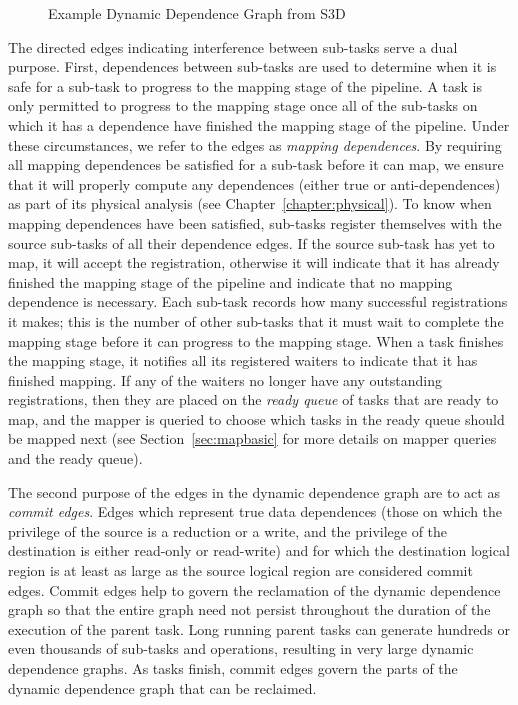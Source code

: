 \begin{figure}[ht!]
\caption{Example Dynamic Dependence Graph from S3D\label{fig:s3ddg}}
\end{figure}

The directed edges indicating interference
between sub-tasks serve a dual purpose. First,
dependences between sub-tasks are used to determine
when it is safe for a sub-task to progress to
the mapping stage of the pipeline.  A task is
only permitted to progress to the mapping stage
once all of the sub-tasks on which it has a
dependence have finished the mapping stage of
the pipeline. Under these circumstances, we
refer to the edges as {\em mapping dependences}.
By requiring all mapping dependences be
satisfied for a sub-task before it can map,
we ensure that it will properly compute any
dependences (either true or anti-dependences)
as part of its physical analysis (see
Chapter~\ref{chapter:physical}). To know when
mapping dependences have been satisfied, sub-tasks
register themselves with the source sub-tasks
of all their dependence edges. If the source
sub-task has yet to map, it will accept the
registration, otherwise it will indicate that
it has already finished the mapping stage
of the pipeline and indicate that no mapping
dependence is necessary.
Each sub-task records how many successful
registrations it makes; this is the number
of other sub-tasks that it must wait to
complete the mapping stage before it can progress
to the mapping stage. When a task finishes
the mapping stage, it notifies all its
registered waiters to indicate that it has
finished mapping. If any of the waiters no
longer have any outstanding registrations, then
they are placed on the {\em ready queue} of 
tasks that are ready to map, and the mapper
is queried to choose which tasks in the
ready queue should be mapped next (see 
Section~\ref{sec:mapbasic} for more details
on mapper queries and the ready queue).

The second purpose of the edges in the
dynamic dependence graph are to act as
{\em commit edges}. Edges which represent
true data dependences (those on which the
privilege of the source is a reduction or 
a write, and the privilege of the 
destination is either read-only or read-write)
and for which the destination logical region
is at least as large as the source logical
region are considered commit edges.  Commit
edges help to govern the reclamation of the
dynamic dependence graph so that the entire
graph need not persist throughout
the duration of the execution of the parent 
task. Long running parent tasks can generate 
hundreds or even thousands of sub-tasks and 
operations, resulting in very large dynamic 
dependence graphs.  As tasks finish, commit edges 
govern the parts of the dynamic dependence
graph that can be reclaimed.

